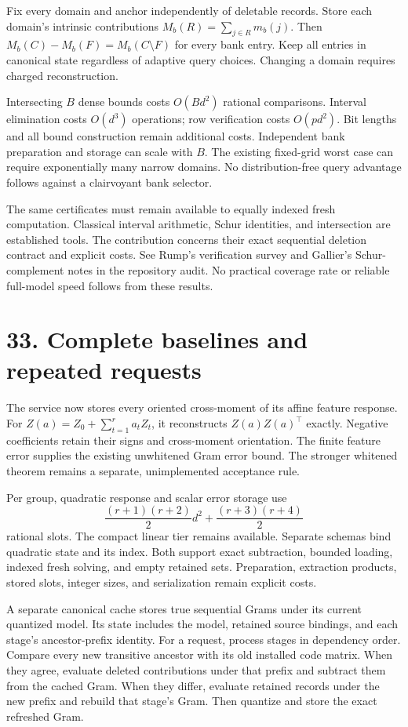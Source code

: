 Fix every domain and anchor independently of deletable records.
Store each domain's intrinsic contributions $M_b(R)=\sum_{j\in R}m_b(j)$.
Then $M_b(C)-M_b(F)=M_b(C\setminus F)$ for every bank entry.
Keep all entries in canonical state regardless of adaptive query choices.
Changing a domain requires charged reconstruction.

Intersecting $B$ dense bounds costs $O(Bd^2)$ rational comparisons.
Interval elimination costs $O(d^3)$ operations; row verification costs $O(pd^2)$.
Bit lengths and all bound construction remain additional costs.
Independent bank preparation and storage can scale with $B$.
The existing fixed-grid worst case can require exponentially many narrow domains.
No distribution-free query advantage follows against a clairvoyant bank selector.

The same certificates must remain available to equally indexed fresh computation.
Classical interval arithmetic, Schur identities, and intersection are established tools.
The contribution concerns their exact sequential deletion contract and explicit costs.
See Rump's verification survey and Gallier's Schur-complement notes in the repository audit.
No practical coverage rate or reliable full-model speed follows from these results.

\newpage
\section*{33. Complete baselines and repeated requests}
The service now stores every oriented cross-moment of its affine feature response.
For $Z(a)=Z_0+\sum_{t=1}^r a_tZ_t$, it reconstructs $Z(a)Z(a)^\top$ exactly.
Negative coefficients retain their signs and cross-moment orientation.
The finite feature error supplies the existing unwhitened Gram error bound.
The stronger whitened theorem remains a separate, unimplemented acceptance rule.

Per group, quadratic response and scalar error storage use
\[
 \frac{(r+1)(r+2)}2d^2+\frac{(r+3)(r+4)}2
\]
rational slots.
The compact linear tier remains available.
Separate schemas bind quadratic state and its index.
Both support exact subtraction, bounded loading, indexed fresh solving, and empty retained sets.
Preparation, extraction products, stored slots, integer sizes, and serialization remain explicit costs.

A separate canonical cache stores true sequential Grams under its current quantized model.
Its state includes the model, retained source bindings, and each stage's ancestor-prefix identity.
For a request, process stages in dependency order.
Compare every new transitive ancestor with its old installed code matrix.
When they agree, evaluate deleted contributions under that prefix and subtract them from the cached Gram.
When they differ, evaluate retained records under the new prefix and rebuild that stage's Gram.
Then quantize and store the exact refreshed Gram.

